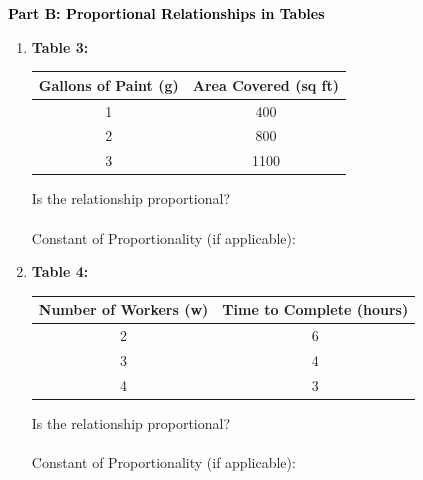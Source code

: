 \documentclass[12pt, letterpaper, fleqn]{article}
\newcommand{\blank}{\underline{\hspace{2.2cm}}}
\begin{document}
\newpage

\begin{tcolorbox}[colback=customteal!20]
\large\textcolor{black}{\textbf{Part B: Proportional Relationships in Tables}}
\end{tcolorbox}

\vspace{3mm}

\begin{enumerate}[itemsep=2.5cm, leftmargin=0.6cm, resume]
\item \begin{tcolorbox}[colback=white, colframe=black, width=\textwidth]
\textbf{Table 3:}
\vspace{2mm}
\begin{center}
\begin{tabular}{|c|c|}
\hline
Gallons of Paint (g) & Area Covered (sq ft) \\
\hline
1 & 400 \\
2 & 800 \\
3 & 1100 \\
\hline
\end{tabular}
\end{center}
\vspace{1cm}
Is the relationship proportional? \blank \\ \\
Constant of Proportionality (if applicable): \blank
\end{tcolorbox}

\vspace{1cm}
\item \begin{tcolorbox}[colback=white, colframe=black, width=\textwidth]
\textbf{Table 4:}
\vspace{2mm}
\begin{center}
\begin{tabular}{|c|c|}
\hline
Number of Workers (w) & Time to Complete (hours) \\
\hline
2 & 6 \\
3 & 4 \\
4 & 3 \\
\hline
\end{tabular}
\end{center}
\vspace{1cm}
Is the relationship proportional? \blank \\ \\
Constant of Proportionality (if applicable): \blank

\end{tcolorbox}

\vspace{1cm}
\end{enumerate}
\end{document}
